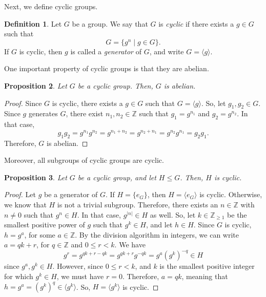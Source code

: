 \documentclass[a4paper, openany]{memoir}
\theoremstyle{definition}
\newtheorem{definition}{Definition}[section]
\theoremstyle{plain}
\newtheorem{proposition}[definition]{Proposition}
\begin{document}
Next, we define cyclic groups.
\begin{definition}
Let $G$ be a group. We say that $G$ is \emph{cyclic} if there exists a $g \in G$ such that
\[G = \{g^n \mid g \in G\}.\]
If $G$ is cyclic, then $g$ is called a \emph{generator} of $G$, and write $G = \langle g \rangle$.
\end{definition}
\noindent One important property of cyclic groups is that they are abelian.
\begin{proposition}
Let $G$ be a cyclic group. Then, $G$ is abelian.
\end{proposition}
\begin{proof}
Since $G$ is cyclic, there exists a $g \in G$ such that $G = \langle g \rangle$. So, let $g_1, g_2 \in G$. Since $g$ generates $G$, there exist $n_1, n_2 \in \mathbb{Z}$ such that $g_1 = g^{n_1}$ and $g_2 = g^{n_2}$. In that case,
\[g_1g_2 = g^{n_1} g^{n_2} = g^{n_1 + n_2} = g^{n_2 + n_1} = g^{n_2} g^{n_1} = g_2g_1.\]
Therefore, $G$ is abelian.
\end{proof}
\noindent Moreover, all subgroups of cyclic groups are cyclic.
\begin{proposition}
Let $G$ be a cyclic group, and let $H \leqslant G$. Then, $H$ is cyclic.
\end{proposition}
\begin{proof}
Let $g$ be a generator of $G$. If $H = \{e_G\}$, then $H = \langle e_G \rangle$ is cyclic. Otherwise, we know that $H$ is not a trivial subgroup. Therefore, there exists an $n \in \mathbb{Z}$ with $n \neq 0$ such that $g^n \in H$. In that case, $g^{|n|} \in H$ as well. So, let $k \in \mathbb{Z}_{\geqslant 1}$ be the smallest positive power of $g$ such that $g^k \in H$, and let $h \in H$. Since $G$ is cyclic, $h = g^a$, for some $a \in \mathbb{Z}$. By the division algorithm in integers, we can write $a = qk + r$, for $q \in \mathbb{Z}$ and $0 \leqslant r < k$. We have
\[g^r = g^{qk + r - qk} = g^{qk + r} g^{-qk} = g^a (g^k)^{-q} \in H\]
since $g^a, g^k \in H$. However, since $0 \leqslant r < k$, and $k$ is the smallest positive integer for which $g^k \in H$, we must have $r = 0$. Therefore, $a = qk$, meaning that $h = g^a = (g^k)^q \in \langle g^k \rangle$. So, $H = \langle g^k \rangle$ is cyclic.
\end{proof}
\end{document}
